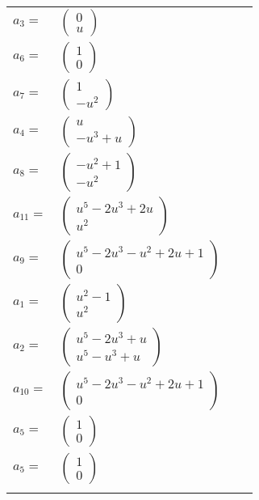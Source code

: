 \documentclass[1p]{elsarticle_modified}
\theoremstyle{definition}
\begin{document}
\begin{tabular}{m{7pt} m{180pt} m{7pt} m{180pt} }
\flushright $a_{3}=$&$\begin{pmatrix}0\\u\end{pmatrix}$ \\
\flushright $a_{6}=$&$\begin{pmatrix}1\\0\end{pmatrix}$ \\
\flushright $a_{7}=$&$\begin{pmatrix}1\\- u^2\end{pmatrix}$ \\
\flushright $a_{4}=$&$\begin{pmatrix}u\\- u^3+u\end{pmatrix}$ \\
\flushright $a_{8}=$&$\begin{pmatrix}- u^2+1\\- u^2\end{pmatrix}$ \\
\flushright $a_{11}=$&$\begin{pmatrix}u^5-2 u^3+2 u\\u^2\end{pmatrix}$ \\
\flushright $a_{9}=$&$\begin{pmatrix}u^5-2 u^3- u^2+2 u+1\\0\end{pmatrix}$ \\
\flushright $a_{1}=$&$\begin{pmatrix}u^2-1\\u^2\end{pmatrix}$ \\
\flushright $a_{2}=$&$\begin{pmatrix}u^5-2 u^3+u\\u^5- u^3+u\end{pmatrix}$ \\
\flushright $a_{10}=$&$\begin{pmatrix}u^5-2 u^3- u^2+2 u+1\\0\end{pmatrix}$ \\
\flushright $a_{5}=$&$\begin{pmatrix}1\\0\end{pmatrix}$\\ \flushright $a_{5}=$&$\begin{pmatrix}1\\0\end{pmatrix}$\\&\end{tabular}
\end{document}
